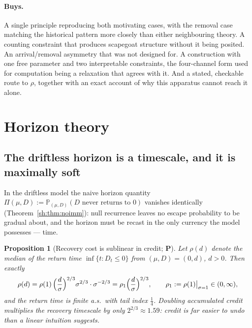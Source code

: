 \documentclass[11pt]{article}
\numberwithin{equation}{section}
\theoremstyle{plain}
\newtheorem{proposition}[theorem]{Proposition}
\theoremstyle{definition}
\theoremstyle{remark}
\newcommand{\PP}{\mathbb{P}}
\begin{document}
\paragraph{Buys.} A single principle reproducing both motivating cases,
with the removal case matching the historical pattern more closely than
either neighbouring theory. A counting constraint that produces
scapegoat structure without it being posited. An arrival/removal
asymmetry that was not designed for. A construction with one free
parameter and two interpretable constraints, the four-channel form used
for computation being a relaxation that agrees with it. And a stated,
checkable route to $\rho$, together with an exact account of why this
apparatus cannot reach it alone.


\appendix

\section{Horizon theory}\label{app:horizon}

\label{sh:sub:horizon}

\subsection{The driftless horizon is a timescale, and it is maximally
soft}\label{sh:subsub:softhorizon}

In the driftless model the naive horizon quantity
$\Pi(\mu,D):=\PP_{(\mu,D)}(D\text{ never returns to }0)$ vanishes
identically (Theorem~\ref{sh:thm:noimm}): null recurrence leaves no escape
probability to be gradual about, and the horizon must be recast in the only
currency the model possesses --- time.

\begin{proposition}[Recovery cost is sublinear in credit; \textbf{P}]
\label{sh:prop:recovery}
Let $\rho(d)$ denote the median of the return time
$\inf\{t:D_t\le0\}$ from $(\mu,D)=(0,d)$, $d>0$. Then exactly
\begin{equation}\label{sh:eq:recovery}
\rho(d)=\rho(1)\,\Bigl(\frac d\sigma\Bigr)^{2/3}\sigma^{2/3}\cdot
\sigma^{-2/3}=\rho_1\Bigl(\frac d\sigma\Bigr)^{2/3},
\qquad \rho_1:=\rho(1)\big|_{\sigma=1}\in(0,\infty),
\end{equation}
and the return time is finite a.s.\ with tail index $\tfrac14$. Doubling
accumulated credit multiplies the recovery timescale by only
$2^{2/3}\approx1.59$: credit is far easier to undo than a linear intuition
suggests.
\end{proposition}
\end{document}
